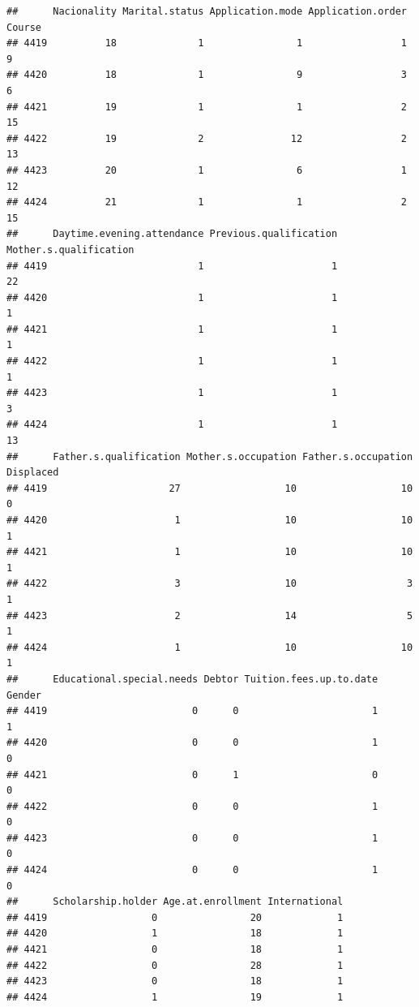 \documentclass[
]{article}
\begin{document}
\begin{verbatim}
##      Nacionality Marital.status Application.mode Application.order Course
## 4419          18              1                1                 1      9
## 4420          18              1                9                 3      6
## 4421          19              1                1                 2     15
## 4422          19              2               12                 2     13
## 4423          20              1                6                 1     12
## 4424          21              1                1                 2     15
##      Daytime.evening.attendance Previous.qualification Mother.s.qualification
## 4419                          1                      1                     22
## 4420                          1                      1                      1
## 4421                          1                      1                      1
## 4422                          1                      1                      1
## 4423                          1                      1                      3
## 4424                          1                      1                     13
##      Father.s.qualification Mother.s.occupation Father.s.occupation Displaced
## 4419                     27                  10                  10         0
## 4420                      1                  10                  10         1
## 4421                      1                  10                  10         1
## 4422                      3                  10                   3         1
## 4423                      2                  14                   5         1
## 4424                      1                  10                  10         1
##      Educational.special.needs Debtor Tuition.fees.up.to.date Gender
## 4419                         0      0                       1      1
## 4420                         0      0                       1      0
## 4421                         0      1                       0      0
## 4422                         0      0                       1      0
## 4423                         0      0                       1      0
## 4424                         0      0                       1      0
##      Scholarship.holder Age.at.enrollment International
## 4419                  0                20             1
## 4420                  1                18             1
## 4421                  0                18             1
## 4422                  0                28             1
## 4423                  0                18             1
## 4424                  1                19             1

\end{verbatim}
\end{document}
